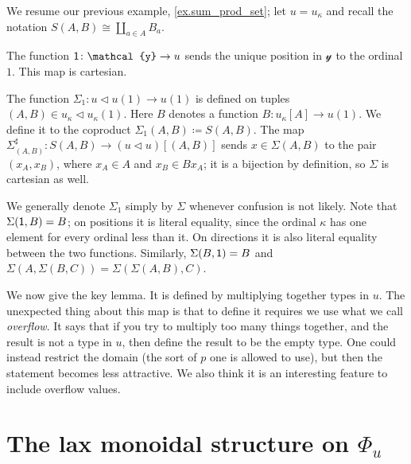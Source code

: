 \documentclass[11pt, one side, article]{memoir}
\theoremstyle{definition}
\theoremstyle{plain}
\newenvironment{example}
  {\pushQED{\qed}\renewcommand{\qedsymbol}{$\lozenge$}\examplex}
  {\popQED\endexamplex}
\newcommand{\yon}{\mathcal{y}}
\newcommand{\0}{\textsf{0}}
\newcommand{\1}{\tn{\textsf{1}}}
\newcommand{\tri}{\mathbin{\triangleleft}}
\begin{document}
\begin{example}
We resume our previous example, \cref{ex.sum_prod_set}; let $u=u_\kappa$ and recall the notation $S(A,B)\cong\coprod_{a\in A}B_a$.

The function $\1\colon\yon\to u$ sends the unique position in $\yon$ to the ordinal $1$. This map is cartesian. 

The function $\Sigma_1\colon u\tri u(1)\to u(1)$ is defined on tuples $(A,B)\in u_\kappa\tri u_\kappa(1)$. Here $B$ denotes a function $B\colon u_\kappa[A]\to u(1)$. We define it to the coproduct $\Sigma_1(A,B)\coloneqq S(A,B)$. The map $\Sigma_{(A,B)}^\sharp\colon S(A,B)\to (u\tri u)[(A,B)]$ sends $x\in \Sigma(A,B)$ to the pair $(x_A,x_B)$, where $x_A\in A$ and $x_B\in B x_A$; it is a bijection by definition, so $\Sigma$ is cartesian as well.

We generally denote $\Sigma_1$ simply by $\Sigma$ whenever confusion is not likely. Note that $\Sigma(\1,B)=B$; on positions it is literal equality, since the ordinal $\kappa$ has one element for every ordinal less than it. On directions it is also literal equality between the two functions. Similarly, $\Sigma(B,\1)=B$ and $\Sigma(A,\Sigma(B,C))=\Sigma(\Sigma(A,B),C)$. 
\end{example}

We now give the key lemma. It is defined by multiplying together types in $u$. The unexpected thing about this map is that to define it requires we use what we call \emph{overflow}. It says that if you try to multiply too many things together, and the result is not a type in $u$, then define the result to be the empty type. One could instead restrict the domain (the sort of $p$ one is allowed to use), but then the statement becomes less attractive. We also think it is an interesting feature to include overflow values.


\section{The lax monoidal structure on $\Phi_u$}
\end{document}
